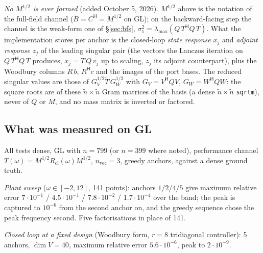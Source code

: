 \documentclass[11pt,a4paper]{article}
\newcommand{\revQ}[1]{{\color{revQ}#1}}
\newcommand{\code}[1]{\texttt{#1}}
\newcommand{\hp}{^{\mathsf H}}
\begin{document}
{{\revQ{\emph{No $M^{1/2}$ is ever formed} (added October 5, 2026).  $M^{1/2}$ above is the
notation of the full-field channel ($B=C\hp=M^{1/2}$ on GL); on the backward-facing step the
channel is the weak-form one of \S\ref{sec:bfs}, $\sigma_1^2=\lambda_{\max}(Q\,T\hp Q\,T)$.
What the implementation stores per anchor is the closed-loop \emph{state response} $x_j$ and
\emph{adjoint response} $z_j$ of the leading singular pair (the vectors the Lanczos iteration
on $Q\,T\hp Q\,T$ produces, $x_j=T\,Q\,v_j$ up to scaling, $z_j$ its adjoint counterpart), plus
the Woodbury columns $R\,b$, $R\hp c$ and the images of the port bases.  The reduced singular
values are those of $G_V^{1/2}\tilde T\,G_W^{1/2}$ with $G_V=V\hp QV$, $G_W=W\hp QW$: the square
roots are of these $\tilde n\times\tilde n$ Gram matrices of the basis (a dense
$\tilde n\times\tilde n$ \code{sqrtm}), never of $Q$ or $M$, and no mass matrix is inverted
or factored.}

\subsection{What was measured on GL}
\label{sec:proj-numbers}
All tests dense, GL with $n=799$ (or $n=399$ where noted), performance channel
$T(\omega)=M^{1/2}R_{\mathrm{cl}}(\omega)M^{1/2}$, $n_{\mathrm{vec}}=3$, greedy anchors,
against a dense ground truth.

\emph{Plant sweep} ($\omega\in[-2,12]$, 141 points): anchors $1/2/4/5$ give maximum
relative error $7\cdot10^{-1}$ / $4.5\cdot10^{-1}$ / $7.8\cdot10^{-2}$ /
$1.7\cdot10^{-4}$ over the band; the peak is captured to $10^{-6}$ from the second anchor
on, and the greedy sequence chose the peak frequency second.  Five factorisations in
place of 141.

\emph{Closed loop at a fixed design} (Woodbury form, $r=8$ tridiagonal controller):
5 anchors, $\dim V=40$, maximum relative error $5.6\cdot10^{-6}$, peak to $2\cdot10^{-9}$.

}}
\end{document}
